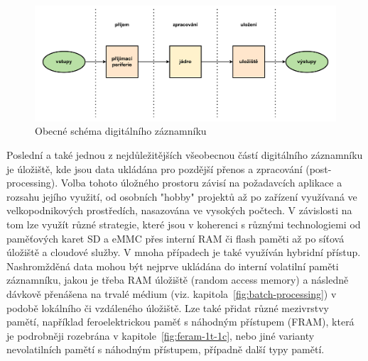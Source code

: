 \begin{figure}[h]
    \centering
    \includegraphics[width=1.00\textwidth]{obrazky-figures/common_digital_datalogger_scheme.pdf}
    \caption{Obecné schéma digitálního záznamníku}
    \label{fig:common-digital-datalogger}
\end{figure}

Poslední a také jednou z nejdůležitějších všeobecnou částí digitálního záznamníku je úložiště, kde jsou data ukládána pro pozdější přenos a zpracování (post-processing). Volba tohoto úložného prostoru závisí na požadavcích aplikace a rozsahu jejího využití, od osobních "hobby" projektů až po zařízení využívaná ve velkopodnikových prostředích, nasazována ve vysokých počtech. V závislosti na tom lze využít různé strategie, které jsou v koherenci s různými technologiemi od paměťových karet SD a eMMC přes interní RAM či flash paměti až po síťová úložiště a cloudové služby. V mnoha případech je také využíván hybridní přístup. Nashromžděná data mohou být nejprve ukládána do interní volatilní paměti záznamníku, jakou je třeba RAM úložiště (random access memory) a následně dávkově přenášena na trvalé médium (viz. kapitola~\ref{fig:batch-processing}) v podobě lokálního či vzdáleného úložiště. Lze také přidat různé mezivrstvy pamětí, například feroelektrickou paměť s náhodným přístupem (FRAM), která je podrobněji rozebrána v kapitole~\ref{fig:feram-1t-1c}, nebo jiné varianty nevolatilních pamětí s náhodným přístupem, případně další typy pamětí. \cite{rta_local_vs_cloud} 

